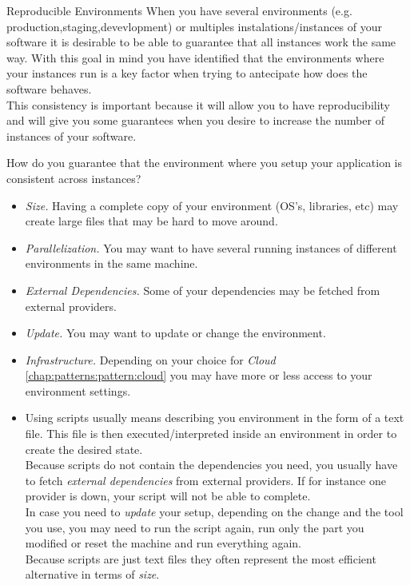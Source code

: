 \begin{pattern}{Reproducible Environments}  \label{chap:patterns:pattern:environment}
    \context
    When you have several environments (e.g. production,staging,devevlopment) or multiples instalations/instances of your software it is desirable to be able to guarantee that all instances work the same way. With this goal in mind you have identified that the environments where your instances run is a key factor when trying to antecipate how does the software behaves. \\
    This consistency is important because it will allow you to have reproducibility and will give you some guarantees when you desire to increase the number of instances of your software.

    \problem
    How do you guarantee that the environment where you setup your application is consistent across instances?
    \forces
    \begin{itemize}
        \item \textit{Size.} Having a complete copy of your environment (OS's, libraries, etc) may create large files that may be hard to move around.
        \item \textit{Parallelization.} You may want to have several running instances of different environments in the same machine.
        \item \textit{External Dependencies.} Some of your dependencies may be fetched from external providers.
        \item \textit{Update.} You may want to update or change the environment.
        \item \textit{Infrastructure.} Depending on your choice for \textit{Cloud} \ref{chap:patterns:pattern:cloud} you may have more or less access to your environment settings.
    \end{itemize}

    \solution
        \begin{itemize}

            \item Using scripts usually means describing you environment in the form of a text file. This file is then executed/interpreted inside an environment in order to create the desired state. \\
            Because scripts do not contain the dependencies you need, you usually have to fetch \textit{external dependencies} from external providers. If for instance one provider is down, your script will not be able to complete. \\
            In case you need to \textit{update} your setup, depending on the change and the tool you use, you may need to run the script again, run only the part you modified or reset the machine and run everything again. \\
            Because scripts are just text files they often represent the most efficient alternative in terms of \textit{size}. \\


\end{itemize}
\end{pattern}
